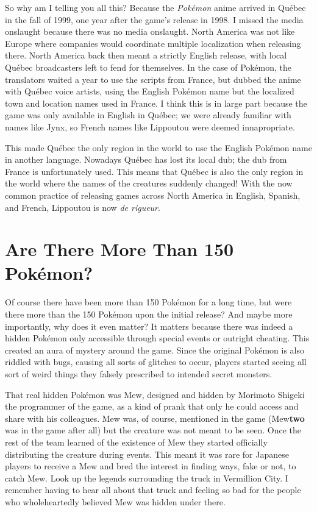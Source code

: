 \documentclass{book}
\begin{document}
So why am I telling you all this? Because the \emph{Pokémon} anime arrived in Québec in the fall of 1999, one year after the game’s release in 1998. I missed the media onslaught because there was no media onslaught. North America was not like Europe where companies would coordinate multiple localization when releasing there. North America back then meant a strictly English release, with local Québec broadcasters left to fend for themselves. In the case of Pokémon, the translators waited a year to use the scripts from France, but dubbed the anime with Québec voice artists, using the English Pokémon name but the localized town and location names used in France. I think this is in large part because the game was only available in English in Québec; we were already familiar with names like Jynx, so French names like Lippoutou were deemed innapropriate.

This made Québec the only region in the world to use the English Pokémon name in another language. Nowadays Québec has lost its local dub; the dub from France is unfortunately used. This means that Québec is also the only region in the world where the names of the creatures suddenly changed! With the now common practice of releasing games across North America in English, Spanish, and French, Lippoutou is now \emph{de rigueur}.

\FloatBarrier\needspace{5pt}\section*{Are There More Than 150 Pokémon?}\nopagebreak[4]

Of course there have been more than 150 Pokémon for a long time, but were there more than the 150 Pokémon upon the initial release? And maybe more importantly, why does it even matter? It matters because there was indeed a hidden Pokémon only accessible through special events or outright cheating. This created an aura of mystery around the game. Since the original Pokémon is also riddled with bugs, causing all sorts of glitches to occur, players started seeing all sort of weird things they falsely prescribed to intended secret monsters.

That real hidden Pokémon was Mew, designed and hidden by Morimoto Shigeki the programmer of the game, as a kind of prank that only he could access and share with his colleagues. Mew was, of course, mentioned in the game (Mew\textbf{two} was in the game after all) but the creature was not meant to be seen. Once the rest of the team learned of the existence of Mew they started officially distributing the creature during events. This meant it was rare for Japanese players to receive a Mew and bred the interest in finding ways, fake or not, to catch Mew. Look up the legends surrounding the truck in Vermillion City. I remember having to hear all about that truck and feeling so bad for the people who wholeheartedly believed Mew was hidden under there.
\end{document}
